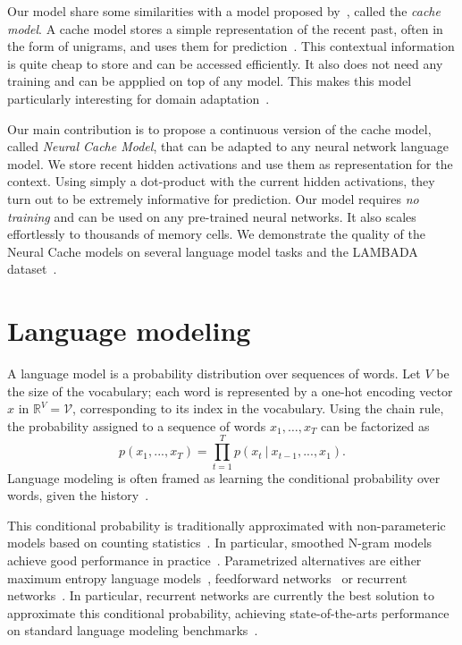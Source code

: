 \documentclass{article} \usepackage{iclr2017_conference,times}
\begin{document}
Our model share some similarities with a model proposed
by~\citet{kuhn1988speech}, called the \emph{cache model}. A cache model stores a
simple representation of the recent past, often in the form of unigrams, and uses
them for prediction~\citep{kuhn1990cache}. This contextual information
is quite cheap to store and can be accessed efficiently. It also does not need
any training and can be appplied on top of any model. This makes this model particularly
interesting for domain adaptation~\citep{kneser1993dynamic}.

Our main contribution is to propose a continuous version of the cache model, called \emph{Neural Cache Model},
that can be adapted to any neural network language model. We store recent hidden activations and use
them as representation for the context. Using simply a dot-product with the current hidden activations, they
turn out to be extremely informative for prediction. Our model requires \emph{no training} and can be used
on any pre-trained neural networks. It also scales effortlessly to thousands of memory cells.
We demonstrate the quality of the Neural Cache models on several language model tasks and the LAMBADA dataset~\citep{paperno2016lambada}.
 
\section{Language modeling}

A language model is a probability distribution over sequences of words.
Let $V$ be the size of the vocabulary; each word is represented by a one-hot
encoding vector $x$ in $\mathbb{R}^V = \mathcal{V}$, corresponding to its index in
the vocabulary.
Using the chain rule, the probability assigned to a sequence of words $x_1,\dots, x_T$ can be factorized as
\begin{equation*}
p(x_1, ..., x_T) = \prod_{t=1}^T p(x_t \ | \ x_{t-1}, ..., x_1).
\end{equation*}
Language modeling is often framed as learning the conditional probability over words, given the history~\citep{bahl1983maximum}.

This conditional probability is traditionally approximated with non-parameteric models based on counting statistics~\citep{goodman2001bit}.
In particular, smoothed N-gram
models~\citep{katz1987estimation,kneser1995improved} achieve good performance
in practice~\citep{mikolov2011empirical}. Parametrized alternatives are either
maximum entropy language models~\citep{rosenfeld1996maximum},
feedforward networks~\citep{bengio2003neural} or  recurrent
networks~\citep{mikolov2010recurrent}. In particular, recurrent networks are
currently the best solution to approximate this conditional probability,
achieving state-of-the-arts performance on standard language
modeling benchmarks~\citep{jozefowicz2016exploring,zilly2016recurrent}.
\end{document}
